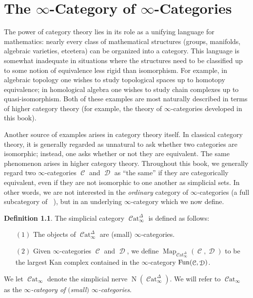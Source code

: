 \documentclass[12pt, final]{report}
\DeclareMathOperator{\Nerve}{N}
\DeclareMathOperator{\bHom}{{Map}}
\DeclareMathOperator{\sSet}{\mathcal{S}et_{\Delta}}
\DeclareMathOperator{\Cat}{\mathcal{C}at}
\DeclareMathOperator{\calC}{\mathcal{C}}
\DeclareMathOperator{\calD}{\mathcal{D}}
\theoremstyle{definition}
\newtheorem{definition}[theorem]{Definition}
\begin{document}
\chapter{The $\infty$-Category of $\infty$-Categories}\label{chap4}

\setcounter{theorem}{0}
\setcounter{subsection}{0}


The power of category theory lies in its role as a unifying language for mathematics: nearly every class of mathematical structures (groups, manifolds, algebraic varieties, etcetera) can be organized into a category. This language is somewhat inadequate in situations where the 
structures need to be classified up to some notion of equivalence less rigid than isomorphism. For example, in algebraic topology one wishes to study topological spaces up to homotopy equivalence; in homological algebra one wishes to study chain complexes up to quasi-isomorphism. Both of these examples are most naturally described in terms of higher category theory (for example, the theory of $\infty$-categories developed in this book).

Another source of examples arises in category theory itself. In classical category theory, it is generally regarded as unnatural to ask whether two categories are isomorphic; instead, one asks whether or not they are equivalent. The same phenomenon arises in higher category theory. Throughout this book, we generally regard two $\infty$-categories $\calC$ and $\calD$ as ``the same'' if they are categorically equivalent, even if they are not isomorphic to one another as simplicial sets. In other words, we are not interested in the {\em ordinary} category of $\infty$-categories (a full subcategory of $\sSet$), but in an underlying $\infty$-category which we now define.

\begin{definition}\index{not}{CatinftyD@$\Cat_{\infty}^{\Delta}$}\index{not}{Catinfty@$\Cat_{\infty}$}
The simplicial category $\Cat_{\infty}^{\Delta}$ is defined as follows:
\begin{itemize}
\item[$(1)$] The objects of $\Cat_{\infty}^{\Delta}$ are (small) $\infty$-categories.

\item[$(2)$] Given $\infty$-categories $\calC$ and $\calD$, we define $\bHom_{\Cat_{\infty}^{\Delta}}(\calC,\calD)$ to be the largest Kan complex contained in the $\infty$-category $\Fun(\calC, \calD)$.
\end{itemize}

We let $\Cat_{\infty}$ denote the simplicial nerve
$\Nerve(\Cat_{\infty}^{\Delta})$. We will refer to $\Cat_{\infty}$ as the {\it $\infty$-category
of $($small$)$ $\infty$-categories}.
\end{definition}
\end{document}
